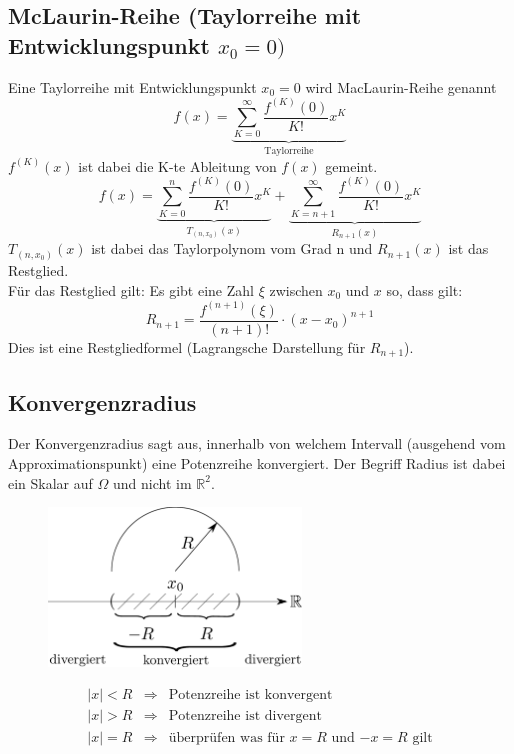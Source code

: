 \subsection{McLaurin-Reihe (Taylorreihe mit Entwicklungspunkt $x_0 = 0)$}
Eine Taylorreihe mit Entwicklungspunkt $x_0 = 0$ wird MacLaurin-Reihe genannt
\[ \boxed{f(x) = \underbrace{\sum_{K=0}^{\infty}\frac{f^{(K)}(0)}{K!} x^K}_{\text{Taylorreihe}}} \]
$f^{(K)}(x)$ ist dabei die K-te Ableitung von $f(x)$ gemeint. 
\[ \boxed{f(x) = \underbrace{\sum_{K=0}^{n}\frac{f^{(K)}(0)}{K!} x^K}_{T_{(n,x_0)}(x)} + \underbrace{\sum_{K=n+1}^{\infty}\frac{f^{(K)}(0)}{K!} x^K}_{R_{n+1}(x)}} \]
$T_{(n,x_0)}(x)$ ist dabei das Taylorpolynom vom Grad n und $R_{n+1}(x)$ ist das Restglied. \\
Für das Restglied gilt: Es gibt eine Zahl $\xi$ zwischen $x_0$ und $x$ so, dass gilt:
\[ \boxed{R_{n+1} = \frac{f^{(n + 1)}(\xi)}{(n + 1)!} \cdot (x - x_0)^{n + 1}} \]
Dies ist eine Restgliedformel (Lagrangsche Darstellung für $R_{n + 1}$).

\subsection{Konvergenzradius}
Der Konvergenzradius sagt aus, innerhalb von welchem Intervall (ausgehend vom Approximationspunkt)
eine Potenzreihe konvergiert. Der Begriff Radius ist dabei ein Skalar auf $\Omega$ und nicht im $\mathbb{R}^2$.

\begin{figure}[h!]
\centering
\includegraphics[width=0.6\textwidth]{konvergenzradius.pdf}
\end{figure}

\[ \boxed{ \begin{array}{lll} 
    |x| < R & \Rightarrow & \text{Potenzreihe ist konvergent} \\
    |x| > R & \Rightarrow & \text{Potenzreihe ist divergent} \\
    |x| = R & \Rightarrow & \text{überprüfen was für $x=R$ und $-x=R$ gilt}
\end{array} } \]


